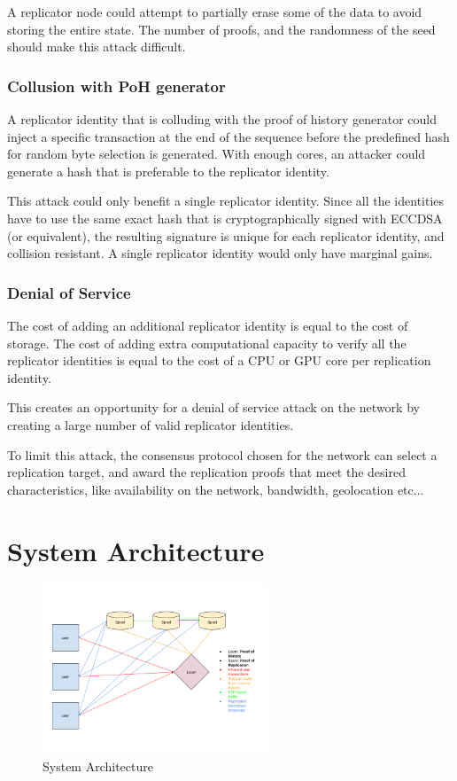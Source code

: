 \documentclass[12pt]{article}
\begin{document}
A replicator node could attempt to partially erase some of the data to avoid storing the entire state.  The number of proofs, and the randomness of the seed should make this attack difficult.

\subsubsection{Collusion with PoH generator}

A replicator identity that is colluding with the proof of history generator could inject a specific transaction at the end of the sequence before the predefined hash for random byte selection is generated.  With enough cores, an attacker could generate a hash that is preferable to the replicator identity.

This attack could only benefit a single replicator identity.  Since all the identities have to use the same exact hash that is cryptographically signed with ECCDSA (or equivalent), the resulting signature is unique for each replicator identity, and collision resistant.  A single replicator identity would only have marginal gains.
\subsubsection{Denial of Service}
The cost of adding an additional replicator identity is equal to the cost of storage.  The cost of adding extra computational capacity to verify all the replicator identities is equal to the cost of a CPU or GPU core per replication identity.

This creates an opportunity for a denial of service attack on the network by creating a large number of valid replicator identities.

To limit this attack, the consensus protocol chosen for the network can select a replication target, and award the replication proofs that meet the desired characteristics, like availability on the network, bandwidth, geolocation etc...
\section{System Architecture}\label{system_architecture}

\begin{figure}
  \begin{center}
    \centering
    \includegraphics[width=0.6\textwidth]{figures/fig_9.png}
    \caption[Fig 9]{System Architecture \label{fig_9}}
  \end{center}
  \end{figure}
\end{document}
